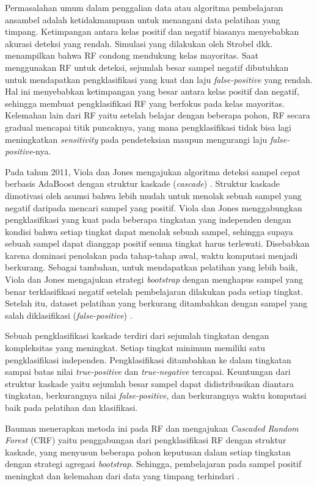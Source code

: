 Permasalahan umum dalam penggalian data atau algoritma pembelajaran ansambel
adalah ketidakmampuan untuk menangani data pelatihan yang timpang.
Ketimpangan antara kelas positif dan negatif biasanya menyebabkan akurasi
deteksi yang rendah.
Simulasi yang dilakukan oleh Strobel dkk. \cite{strobl2007bias} menampilkan
bahwa RF condong mendukung kelas mayoritas.
Saat menggunakan RF untuk deteksi, sejumlah besar sampel negatif dibutuhkan
untuk mendapatkan pengklasifikasi yang kuat dan laju \textit{false-positive}
yang rendah.
Hal ini menyebabkan ketimpangan yang besar antara kelas positif dan
negatif, sehingga membuat pengklasifikasi RF yang berfokus pada kelas
mayoritas.
Kelemahan lain dari RF yaitu setelah belajar dengan beberapa pohon, RF secara
gradual mencapai titik puncaknya, yang mana pengklasifikasi tidak bisa lagi
meningkatkan \textit{sensitivity} pada pendeteksian maupun mengurangi laju
\textit{false-positive}-nya.

Pada tahun 2011, Viola dan Jones mengajukan algoritma deteksi sampel cepat
berbasis AdaBoost dengan struktur kaskade (\textit{cascade})
\cite{viola2004robust}.
Struktur kaskade dimotivasi oleh asumsi bahwa lebih mudah untuk menolak sebuah
sampel yang negatif daripada mencari sampel yang positif.
Viola dan Jones menggabungkan pengklasifikasi yang kuat pada beberapa tingkatan
yang independen dengan kondisi bahwa setiap tingkat dapat menolak sebuah
sampel, sehingga supaya sebuah sampel dapat dianggap positif semua tingkat
harus terlewati.
Disebabkan karena dominasi penolakan pada tahap-tahap awal, waktu komputasi
menjadi berkurang.
Sebagai tambahan, untuk mendapatkan pelatihan yang lebih baik, Viola dan Jones
mengajukan strategi \textit{bootstrap} dengan menghapus sampel yang benar
terklasifikasi negatif setelah pembelajaran dilakukan pada setiap tingkat.
Setelah itu, dataset pelatihan yang berkurang ditambahkan dengan sampel yang
salah diklasifikasi (\textit{false-positive})
\cite{viola2004robust}.

Sebuah pengklasifikasi kaskade terdiri dari sejumlah tingkatan dengan
kompleksitas yang meningkat.
Setiap tingkat minimum memiliki satu pengklasifikasi independen.
Pengklasifikasi ditambahkan ke dalam tingkatan sampai batas nilai
\textit{true-positive} dan \textit{true-negative} tercapai.
Keuntungan dari struktur kaskade yaitu sejumlah besar sampel dapat
didistribusikan diantara tingkatan, berkurangnya nilai \textit{false-positive},
dan berkurangnya waktu komputasi baik pada pelatihan dan klasifikasi.

Bauman menerapkan metoda ini pada RF dan mengajukan \textit{Cascaded Random
Forest} (CRF) yaitu penggabungan dari pengklasifikasi RF dengan struktur
kaskade, yang menyusun beberapa pohon keputusan dalam setiap tingkatan dengan
strategi agregasi \textit{bootstrap}.
Sehingga, pembelajaran pada sampel positif meningkat dan kelemahan dari data
yang timpang terhindari \cite{baumann2013cascaded}.

